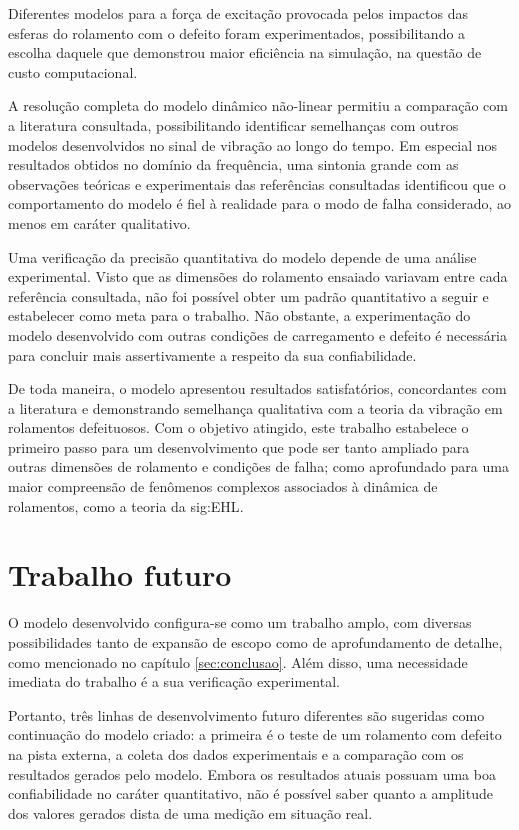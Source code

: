 \documentclass[12pt,oneside,english,brazil,lmodern,siglas,simbolos,cite=num]{ucsmonograph}
\begin{document}
	Diferentes modelos para a força de excitação provocada pelos impactos das esferas do rolamento com o defeito foram experimentados, possibilitando a escolha daquele que demonstrou maior eficiência na simulação, na questão de custo computacional.
	
	A resolução completa do modelo dinâmico não-linear permitiu a comparação com a literatura consultada, possibilitando identificar semelhanças com outros modelos desenvolvidos no sinal de vibração ao longo do tempo.
	Em especial nos resultados obtidos no domínio da frequência, uma sintonia grande com as observações teóricas e experimentais das referências consultadas identificou que o comportamento do modelo é fiel à realidade para o modo de falha considerado, ao menos em caráter qualitativo.
	
	Uma verificação da precisão quantitativa do modelo depende de uma análise experimental.
	Visto que as dimensões do rolamento ensaiado variavam entre cada referência consultada, não foi possível obter um padrão quantitativo a seguir e estabelecer como meta para o trabalho.
	Não obstante, a experimentação do modelo desenvolvido com outras condições de carregamento e defeito é necessária para concluir mais assertivamente a respeito da sua confiabilidade.
	
	De toda maneira, o modelo apresentou resultados satisfatórios, concordantes com a literatura e demonstrando semelhança qualitativa com a teoria da vibração em rolamentos defeituosos.
	Com o objetivo atingido, este trabalho estabelece o primeiro passo para um desenvolvimento que pode ser tanto ampliado para outras dimensões de rolamento e condições de falha; como aprofundado para uma maior compreensão de fenômenos complexos associados à dinâmica de rolamentos, como a teoria da \gls{sig:EHL}.
	
	\chapter{Trabalho futuro}
	O modelo desenvolvido configura-se como um trabalho amplo, com diversas possibilidades tanto de expansão de escopo como de aprofundamento de detalhe, como mencionado no capítulo \ref{sec:conclusao}.
	Além disso, uma necessidade imediata do trabalho é a sua verificação experimental.
	
	Portanto, três linhas de desenvolvimento futuro diferentes são sugeridas como continuação do modelo criado: a primeira é o teste de um rolamento com defeito na pista externa, a coleta dos dados experimentais e a comparação com os resultados gerados pelo modelo.
	Embora os resultados atuais possuam uma boa confiabilidade no caráter quantitativo, não é possível saber quanto a amplitude dos valores gerados dista de uma medição em situação real.
	
\end{document}
